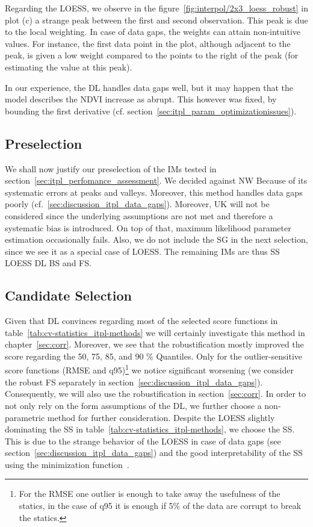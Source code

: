 {{        Regarding the LOESS, we observe in the figure~\ref{fig:interpol/2x3_loess_robust} in plot (c) a strange peak between the first and second observation. This peak is due to the local weighting. In case of data gaps, the weights can attain non-intuitive values. For instance, the first data point in the plot, although adjacent to the peak, is given a low weight compared to the points to the right of the peak (for estimating the value at this peak).

        In our experience, the DL handles data gaps well, but it may happen that the model describes the NDVI increase as abrupt. This however was fixed, by bounding the first derivative (cf. section~\ref{sec:itpl_param_optimizationissues}).
    }

    \subsection{Preselection}{\label{sec:itpl_preselection}
        We shall now justify our preselection of the {{IM}}s tested in section~\ref{sec:itpl_perfomance_assessment}. 
        We decided against NW Because of its systematic errors at peaks and valleys. Moreover, this method handles data gaps poorly (cf.~\ref{sec:discussion_itpl_data_gaps}). 
        Moreover, UK will not be considered since the underlying assumptions are not met and therefore a systematic bias is introduced. On top of that, maximum likelihood parameter estimation occasionally fails.
        Also, we do not include the SG in the next selection, since we see it as a special case of LOESS.
        The remaining IMs are thus SS LOESS DL BS and FS.
    }

    \subsection{Candidate Selection}{\label{sec:itpl_candiate_selection}
        Given that DL convinces regarding most of the selected score functions in table~\ref{tab:cv-statistics_itpl-methods} we will certainly investigate this method in chapter~\ref{sec:corr}. Moreover, we see that the robustification mostly improved the score regarding the 50, 75, 85, and 90 \% Quantiles. Only for the outlier-sensitive score functions (RMSE and q95)\footnote{For the RMSE one outlier is enough to take away the usefulness of the statics, in the case of q95 it is enough if 5\% of the data are corrupt to break the statics.} we notice significant worsening (we consider the robust FS separately in section~\ref{sec:discussion_itpl_data_gaps}). Consequently, we will also use the robustification in section~\ref{sec:corr}.
        In order to not only rely on the form assumptions of the DL, we further choose a non-parametric method for further consideration. Despite the LOESS slightly dominating the SS in table~\ref{tab:cv-statistics_itpl-methods}, we choose the SS. This is due to the strange behavior of the LOESS in case of data gaps (see section~\ref{sec:discussion_itpl_data_gaps}) and the good interpretability of the SS using the minimization function~.
    }
}


